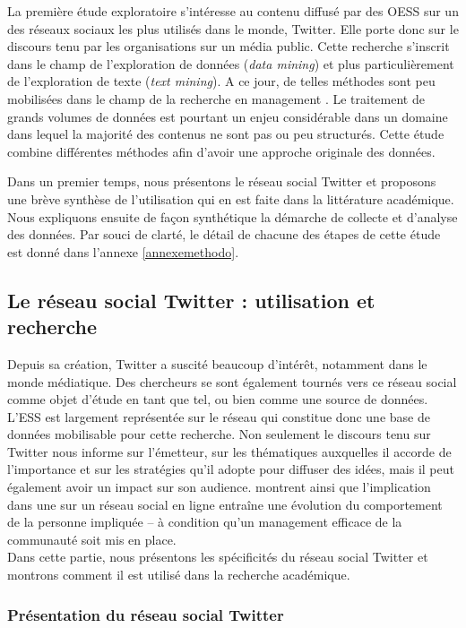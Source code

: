 
La première étude exploratoire s’intéresse au contenu diffusé par des OESS sur un des réseaux sociaux les plus utilisés dans le monde, Twitter. Elle porte donc sur le discours tenu par les organisations sur un média public. Cette recherche s’inscrit dans le champ de l’exploration de données (\textit{data mining}) et plus particulièrement de l’exploration de texte (\textit{text mining}). A ce jour, de telles méthodes sont peu mobilisées dans le champ de la recherche en management \parencite{kobayashi2018text}. Le traitement de grands volumes de données est pourtant un enjeu considérable dans un domaine dans lequel la majorité des contenus ne sont pas ou peu structurés. Cette étude combine différentes méthodes afin d’avoir une approche originale des données.

Dans un premier temps, nous présentons le réseau social Twitter et proposons une brève synthèse de l’utilisation qui en est faite dans la littérature académique. Nous expliquons ensuite de façon synthétique la démarche de collecte et d’analyse des données. Par souci de clarté, le détail de chacune des étapes de cette étude est donné dans l’annexe \ref{annexemethodo}.

\subsection{Le réseau social Twitter : utilisation et recherche}
    Depuis sa création, Twitter a suscité beaucoup d’intérêt, notamment dans le monde médiatique. Des chercheurs se sont également tournés vers ce réseau social comme objet d’étude en tant que tel, ou bien comme une source de données. L’ESS est largement représentée sur le réseau qui constitue donc une base de données mobilisable pour cette recherche. Non seulement le discours tenu sur Twitter nous informe sur l’émetteur, sur les thématiques auxquelles il accorde de l’importance et sur les stratégies qu’il adopte pour diffuser des idées, mais il peut également avoir un impact sur son audience. \textcite{gummerus2017ethical} montrent ainsi que l’implication dans une   sur un réseau social en ligne entraîne une évolution du comportement de la personne impliquée – à condition qu’un management efficace de la communauté soit mis en place. \\

    Dans cette partie, nous présentons les spécificités du réseau social Twitter et montrons comment il est utilisé dans la recherche académique.


    \subsubsection{Présentation du réseau social Twitter}

